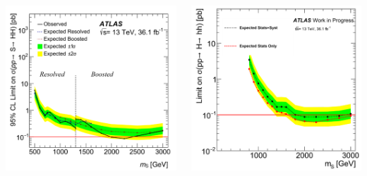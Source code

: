 \documentclass{beamer}
\newcommand*{\header}[1]{\fontsize{16}{8}\selectfont \textbf{{\color{MyPurple}{#1}}}}
\begin{document}
\begin{frame}
\begin{center}
\header{Results}
\end{center}
\begin{columns}
\begin{column}{0.5\textwidth}
\begin{center}
\color{MyPurple}{Published Analysis}
\includegraphics[width=01\textwidth]{figures/limit_2016_reOpt_HiggsApproved_Scalar_Paper_Combined_20190312_01_line}
\end{center}
\end{column}
\begin{column}{0.5\textwidth}
\begin{center}
\vspace{0.3cm}\color{MyPurple}{Improved Fully-Boosted Analysis}
\includegraphics[width=01\textwidth]{figures/Final_limits_line}

\end{center}
\end{column}
\end{columns}
\end{frame}
\end{document}
